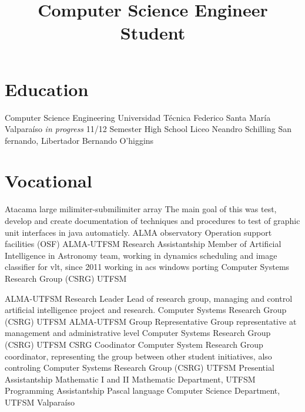 \documentclass[11pt,a4paper]{moderncv}
\title{Computer Science Engineer Student}
\begin{document}
\maketitle


\section{Education}
	{Computer Science Engineering}
	{Universidad Técnica Federico Santa María}
	{Valparaíso}
	{\emph{in progress}}
	{11/12 Semester}
	{High School}
	{Liceo Neandro Schilling}
	{San fernando, Libertador Bernando O'higgins}
	{}{}
\vspace{-0.5cm}

\section{Vocational}
	{Atacama large milimiter-submilimiter array}
	{The main goal of this was test, develop and create documentation of techniques and procedures to test of graphic
	unit interfaces in java automaticly.}
	{ALMA observatory}
	{Operation support facilities (OSF)}
	{}
	{ALMA-UTFSM Research Assistantship}
	{Member of Artificial Intelligence in Astronomy team, working in dynamics scheduling and image classifier for vlt, since 2011 working in acs windows porting}
	{Computer Systems Research Group (CSRG)}
	{UTFSM}
	{}

	{ALMA-UTFSM Research Leader}
	{Lead of research group, managing and control artificial intelligence project and research.}
	{Computer Systems Research Group (CSRG)}
	{UTFSM}
	{}
        {ALMA-UTFSM Group Representative}
        {Group representative at management and administrative level}
        {Computer Systems Research Group (CSRG)}
        {UTFSM}
        {}
        {CSRG Coodinator}
	{Computer System Research Group coordinator, representing the group between other student initiatives, also
	controling }
        {Computer Systems Research Group (CSRG)}
        {UTFSM}
        {}
	{Presential Assistantship}
	{Mathematic I and II}
	{Mathematic Department, UTFSM}
	{}{}
	{Programming Assistantship}
	{Pascal language}
	{Computer Science Department, UTFSM}
	{Valparaíso}
	{}
\end{document}
